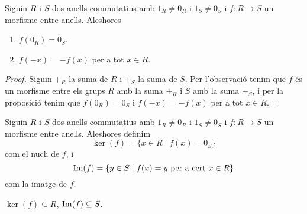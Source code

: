 \documentclass[../../Main.tex]{subfiles}
\begin{document}
	\begin{proposition}
		\label{prop:propietats morfismes entre anells}
			Siguin \(R\) i \(S\) dos anells commutatius amb \(1_{R}\neq0_{R}\) i \(1_{S}\neq0_{S}\) i \(f\colon R\longrightarrow S\) un morfisme entre anells. Aleshores
		\begin{enumerate}
			\item \(f(0_{R})=0_{S}\).
			\item \(f(-x)=-f(x)\) per a tot \(x\in R\).
		\end{enumerate}
		\begin{proof}
			Siguin \(+_{R}\) la suma de \(R\) i \(+_{S}\) la suma de \(S\). Per l'observació  tenim que \(f\) és un morfisme entre els grups \(R\) amb la suma \(+_{R}\) i \(S\) amb la suma \(+_{S}\), i per la proposició  tenim que \(f(0_{R})=0_{S}\) i \(f(-x)=-f(x)\) per a tot \(x\in R\).
		\end{proof}
	\end{proposition}
	\begin{definition}
		\label{def:nucli d'un morfisme entre anells}
		\label{def:imatge d'un morfisme entre anells}
		Siguin \(R\) i \(S\) dos anells commutatius amb \(1_{R}\neq0_{R}\) i \(1_{S}\neq0_{S}\) i \(f\colon R\longrightarrow S\) un morfisme entre anells. Aleshores definim
		\[\ker(f)=\{x\in R\mid f(x)=0_{S}\}\]
		com el nucli de \(f\), i
		\[\operatorname{Im}(f)=\{y\in S\mid f(x)=y\text{ per a cert }x\in R\}\]
		com la imatge de \(f\).
	\end{definition}
	\begin{observation}
		\label{obs:nucli d'un morfisme entre anells es subconjunt del grup d'entrada, imatge n'és del de sortida}
		\(\ker(f)\subseteq R\), \(\operatorname{Im}(f)\subseteq S\).
	\end{observation}
\end{document}

